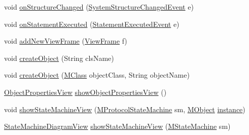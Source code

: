 \begin{DoxyCompactItemize}
\item 
void \hyperlink{classorg_1_1tzi_1_1use_1_1gui_1_1main_1_1_main_window_a538189d13f8bb29b3e136d4d2118554c}{on\-Structure\-Changed} (\hyperlink{interfaceorg_1_1tzi_1_1use_1_1uml_1_1sys_1_1events_1_1tags_1_1_system_structure_changed_event}{System\-Structure\-Changed\-Event} e)
\item 
void \hyperlink{classorg_1_1tzi_1_1use_1_1gui_1_1main_1_1_main_window_a14f6b6367d7b4e6f6b714e00352e93f6}{on\-Statement\-Executed} (\hyperlink{classorg_1_1tzi_1_1use_1_1uml_1_1sys_1_1events_1_1_statement_executed_event}{Statement\-Executed\-Event} e)
\item 
void \hyperlink{classorg_1_1tzi_1_1use_1_1gui_1_1main_1_1_main_window_a831a2321407479a5b21b60276de099fd}{add\-New\-View\-Frame} (\hyperlink{classorg_1_1tzi_1_1use_1_1gui_1_1main_1_1_view_frame}{View\-Frame} f)
\item 
void \hyperlink{classorg_1_1tzi_1_1use_1_1gui_1_1main_1_1_main_window_a9dd2f1d78db188d35ff92dff4ef234c5}{create\-Object} (String cls\-Name)
\item 
void \hyperlink{classorg_1_1tzi_1_1use_1_1gui_1_1main_1_1_main_window_a5427a9a2316570cacc8d2f8ebfebb271}{create\-Object} (\hyperlink{interfaceorg_1_1tzi_1_1use_1_1uml_1_1mm_1_1_m_class}{M\-Class} object\-Class, String object\-Name)
\item 
\hyperlink{classorg_1_1tzi_1_1use_1_1gui_1_1views_1_1_object_properties_view}{Object\-Properties\-View} \hyperlink{classorg_1_1tzi_1_1use_1_1gui_1_1main_1_1_main_window_adbce2c2e065868586792dab11f4a8c01}{show\-Object\-Properties\-View} ()
\item 
void \hyperlink{classorg_1_1tzi_1_1use_1_1gui_1_1main_1_1_main_window_ab060f5a102ea2ec979554b6766022af5}{show\-State\-Machine\-View} (\hyperlink{classorg_1_1tzi_1_1use_1_1uml_1_1mm_1_1statemachines_1_1_m_protocol_state_machine}{M\-Protocol\-State\-Machine} sm, \hyperlink{interfaceorg_1_1tzi_1_1use_1_1uml_1_1sys_1_1_m_object}{M\-Object} \hyperlink{classorg_1_1tzi_1_1use_1_1gui_1_1main_1_1_main_window_a8a587b47aec0c0ea55a341961af6c9a1}{instance})
\item 
\hyperlink{classorg_1_1tzi_1_1use_1_1gui_1_1views_1_1diagrams_1_1statemachine_1_1_state_machine_diagram_view}{State\-Machine\-Diagram\-View} \hyperlink{classorg_1_1tzi_1_1use_1_1gui_1_1main_1_1_main_window_aad2446516bc3c51805bfe8ac6a28ba14}{show\-State\-Machine\-View} (\hyperlink{classorg_1_1tzi_1_1use_1_1uml_1_1mm_1_1statemachines_1_1_m_state_machine}{M\-State\-Machine} sm)
\end{DoxyCompactItemize}
